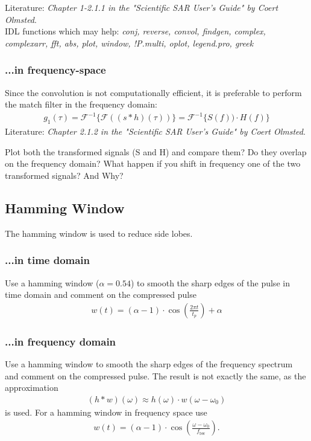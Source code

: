 Literature: \textit{Chapter 1-2.1.1 in the "Scientific SAR User's Guide" by Coert Olmsted}.\\
IDL functions which may help: \textit{conj, reverse, convol, findgen, complex, complexarr, fft, abs, plot, window, !P.multi, oplot, legend.pro, greek}


\subsubsection{...in frequency-space}

Since the convolution is not computationally efficient, it is preferable to perform the match filter in the frequency domain:
\begin{align}
g_1(\tau) = \mathcal{F}^{-1}\Big\{\mathcal{F}\left((s*h)(\tau)\right)\Big\} = \mathcal{F}^{-1}\Big\{S(f))\cdot H(f)\Big\}
\end{align}
Literature: \textit{Chapter 2.1.2 in the "Scientific SAR User's Guide" by Coert Olmsted}.

Plot both the transformed signals (S and H) and compare them? Do they overlap on the frequency domain? What happen if you shift in frequency one of the two transformed signals? And Why?  


\subsection{Hamming Window}
The hamming window is used to reduce side lobes.

\subsubsection{...in time domain}
Use a hamming window ($\alpha = 0.54$) to smooth the sharp edges of the pulse in time domain and comment on the compressed pulse
\begin{align}
w(t) = (\alpha-1)\cdot\cos(\frac{2\pi t}{t_p}) + \alpha
\end{align}

\subsubsection{...in frequency domain}
Use a hamming window to smooth the sharp edges of the frequency spectrum and comment on the compressed pulse. The result is not exactly the same, as the approximation
\begin{align}
(h*w)(\omega) \approx h(\omega)\cdot w(\omega-\omega_0)
\end{align}
is used. For a hamming window in frequency space use
\begin{align}
w(t) = (\alpha-1)\cdot\cos(\frac{\omega - \omega_0}{f_{\text{bw}}}).
\end{align}

